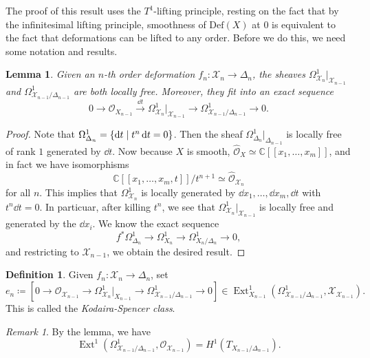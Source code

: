 \documentclass[leqno, openany]{memoir}
\newtheorem{lem}[thm]{Lemma}
\theoremstyle{definition}
\newtheorem{defn}[thm]{Definition}
\theoremstyle{remark}
\newtheorem{rmk}[thm]{Remark}
\theoremstyle{plain}
\theoremstyle{definition}
\theoremstyle{remark}
\newcommand{\C}{\mathbb{C}}
\newcommand{\mc}[1]{\mathcal{#1}}
\newcommand{\mr}[1]{\mathrm{#1}}
\newcommand{\wh}[1]{\widehat{#1}}
\DeclareMathOperator{\Ext}{Ext}
\begin{document}
The proof of this result uses the $T^1$-lifting principle, resting on the fact that by the infinitesimal lifting principle, smoothness of $\mr{Def}(X)$ at $0$ is equivalent to the fact that deformations can be lifted to any order. Before we do this, we need some notation and results.

\begin{lem}
    Given an $n$-th order deformation $f_n \colon \mc{X}_n \to \Delta_n$, the sheaves $\Omega^1_{\mc{X}_n} |_{\mc{X}_{n-1}}$ and $\Omega^1_{\mc{X}_{n-1}/\Delta_{n-1}}$ are both locally free. Moreover, they fit into an exact sequence
    \[ 0 \to \mc{O}_{X_{n-1}} \xrightarrow{\dd{t}} \Omega^1_{\mc{X}_n} |_{\mc{X}_{n-1}} \to \Omega^1_{\mc{X}_{n-1} / \Delta_{n-1}} \to 0. \]
\end{lem}

\begin{proof}
    Note that $\Omega^1_{\Delta_n} = \qty{\dd{t} \mid t^n \dd{t} = 0}$. Then the sheaf $\Omega^1_{\Delta_n} |_{\Delta_{n-1}}$ is locally free of rank $1$ generated by $\dd{t}$. Now because $X$ is smooth, $\wh{\mc{O}}_X \simeq \C[[x_1, \ldots, x_m]]$, and in fact we have isomorphisms
    \[ \C[[x_1, \ldots, x_m, t]] / t^{n+1} \simeq \wh{\mc{O}}_{\mc{X}_n} \]
    for all $n$. This implies that $\Omega^1_{\mc{X}_n}$ is locally generated by $\dd{x_1}, \ldots, \dd{x_m}, \dd{t}$ with $t^n \dd{t} = 0$. In particuar, after killing $t^n$, we see that $\Omega^1_{\mc{X}_n} |_{\mc{X}_{n-1}}$ is locally free and generated by the $\dd{x_i}$. We know the exact sequence
    \[ f^* \Omega^1_{\Delta_n} \to \Omega^1_{X_n} \to \Omega^1_{X_n/\Delta_n} \to 0, \]
    and restricting to $\mc{X}_{n-1}$, we obtain the desired result.
\end{proof}

\begin{defn}
    Given $f_n \colon \mc{X}_n \to \Delta_n$, set
    \[ e_n \coloneqq [0 \to \mc{O}_{\mc{X}_{n-1}} \to \Omega^1_{\mc{X}_n} |_{X_{n-1}} \to \Omega^1_{\mc{X}_{n-1} / \Delta_{n-1}} \to 0] \in \Ext^1_{X_{n-1}}(\Omega^1_{\mc{X}_{n-1}/\Delta_{n-1}}, \mc{X}_{\mc{X}_{n-1}}). \]
    This is called the \textit{Kodaira-Spencer class}.
\end{defn}

\begin{rmk}
    By the lemma, we have
    \[ \Ext^1(\Omega^1_{\mc{X}_{n-1} / \Delta_{n-1}}, \mc{O}_{\mc{X}_{n-1}}) = H^1(T_{X_{n-1}/\Delta_{n-1}}). \]
\end{rmk}
\end{document}
